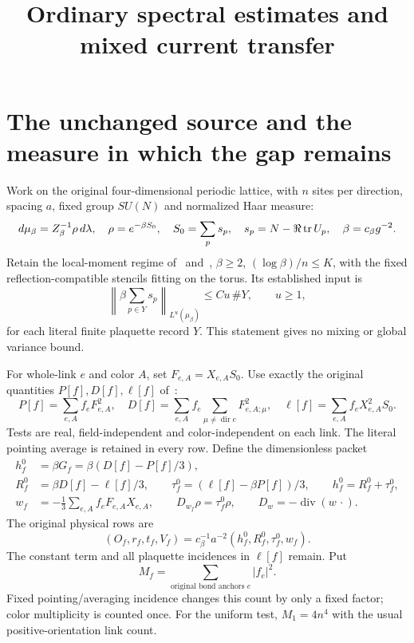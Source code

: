 \documentclass[11pt,letterpaper]{article}
\title{Ordinary spectral estimates and mixed current transfer}\author{}\date{}
\theoremstyle{remark}\newtheorem{remark}[theorem]{Remark}
\newcommand{\diver}{\operatorname{div}}\newcommand{\Ad}{\operatorname{Ad}}
\newcommand{\cB}{c_\beta}\newcommand{\dd}{\,d}
\newcommand{\norm}[1]{\left\lVert#1\right\rVert}
\begin{document}
\maketitle
\section{The unchanged source and the measure in which the gap remains}

Work on the original four-dimensional periodic lattice, with $n$ sites per direction, spacing $a$, fixed group $SU(N)$ and normalized Haar measure:
\begin{equation}\label{eq:law}
 d\mu_\beta=Z_\beta^{-1}\rho\dd\lambda,\quad
 \rho=e^{-\beta S_0},\quad S_0=\sum_p s_p,\quad
 s_p=N-\Re\tr U_p,\quad \beta=\cB g^{-2}.
\end{equation}
Retain the local-moment regime of~\cite[\S2]{ND} and~\cite[\S1]{SZ}, $\beta\ge2$, $(\log\beta)/n\le K$, with the fixed reflection-compatible stencils fitting on the torus. Its established input is
\begin{equation}\label{eq:localmom}
 \norm{\beta\sum_{p\in Y}s_p}_{L^u(\mu_\beta)}
 \le Cu\,\#Y,\qquad u\ge1,
\end{equation}
for each literal finite plaquette record $Y$. This statement gives no mixing or global variance bound.

For whole-link $e$ and color $A$, set $F_{e,A}=X_{e,A}S_0$. Use exactly the original quantities $P[f],D[f],\ell[f]$ of~\cite[\S1]{SZ}:
\[
 P[f]=\sum_{e,A}f_eF_{e,A}^2,\quad
 D[f]=\sum_{e,A}f_e\sum_{\mu\ne\operatorname{dir}e}F_{e,A;\mu}^2,\quad
 \ell[f]=\sum_{e,A}f_eX_{e,A}^2S_0.
\]
Tests are real, field-independent and color-independent on each link. The literal pointing average is retained in every row. Define the dimensionless packet
\begin{align}\label{eq:packet}
 h_f^0&=\beta G_f=\beta(D[f]-P[f]/3),\\
 R_f^0&=\beta D[f]-\ell[f]/3,\qquad
 \tau_f^0=(\ell[f]-\beta P[f])/3,\qquad h_f^0=R_f^0+\tau_f^0,\nonumber\\
 w_f&=-\tfrac13\sum_{e,A}f_eF_{e,A}X_{e,A},\qquad
 D_{w_f}\rho=\tau_f^0\rho,\qquad D_w=-\diver(w\,\cdot).\nonumber
\end{align}
The original physical rows are
\begin{equation}\label{eq:phys}
 (O_f,r_f,t_f,V_f)=\cB^{-1}a^{-2}(h_f^0,R_f^0,\tau_f^0,w_f).
\end{equation}
The constant term and all plaquette incidences in $\ell[f]$ remain. Put
\[
 M_f=\sum_{\text{original bond anchors }e}|f_e|^2.
\]
Fixed pointing/averaging incidence changes this count by only a fixed factor; color multiplicity is counted once. For the uniform test, $M_1=4n^4$ with the usual positive-orientation link count.
\end{document}
